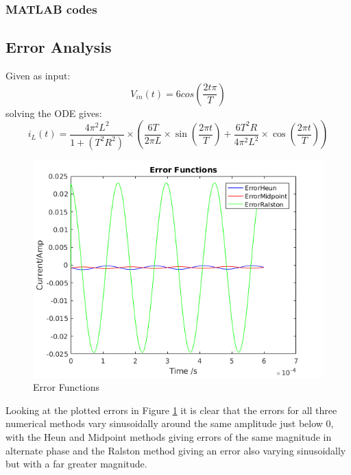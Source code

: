 \documentclass[a4paper, 12pt]{article}
\begin{document}
\subsubsection{MATLAB codes}
\par

\par

\par


\newpage
\subsection{Error Analysis}\FloatBarrier
Given as input:
\[
      V_{in}(t)=6 cos(\frac{2t\pi}{T})
\]
solving the ODE gives:
\[
      i_L(t)=\frac{4\pi^2L^2}{1+(T^2R^2)}\times \left( \frac{6T}{2\pi L} \times \sin(\frac{2\pi t}{T}) + \frac{6T^2R}{4\pi^2L^2} \times \cos(\frac{2\pi t}{T}) \right)
\]

\begin{figure}[h]
\centering
\includegraphics[width=\textwidth]{ex2/errorfunctions.png}
\caption{Error Functions}
\label{fig:ErrorFunctions}
\end{figure}

Looking at the plotted errors in Figure \ref{fig:ErrorFunctions} it is clear that the errors for all three numerical methods vary sinusoidally around the same amplitude just below $0$, with the Heun and Midpoint methods giving errors of the same magnitude in alternate phase and the Ralston method giving an error also varying sinusoidally but with a far greater magnitude.
\end{document}
